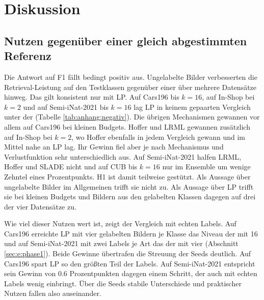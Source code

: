 \chapter{Diskussion}
\label{chap:diskussion}

\section{Nutzen gegenüber einer gleich abgestimmten Referenz}
\label{sec:d:nutzen}

Die Antwort auf F1 fällt bedingt positiv aus. Ungelabelte Bilder verbesserten die Retrieval-Leistung auf den Testklassen gegenüber einer \UEBL über mehrere Datensätze hinweg. Das gilt konsistent nur mit \ac{LP}. Auf Cars196 bis $k=16$, auf In-Shop bei $k=2$ und auf Semi-iNat-2021 bis $k=16$ lag \ac{LP} in keinem gepaarten Vergleich unter der \UEBL (Tabelle \ref{tab:anhang:negativ}). Die übrigen Mechanismen gewannen vor allem auf Cars196 bei kleinen Budgets. Hoffer und \ac{LRML} gewannen zusätzlich auf In-Shop bei $k=2$, wo Hoffer ebenfalls in jedem Vergleich gewann und im Mittel nahe an \ac{LP} lag. Ihr Gewinn fiel aber je nach Mechanismus und Verlustfunktion sehr unterschiedlich aus. Auf Semi-iNat-2021 halfen \ac{LRML}, Hoffer und \ac{SLADE} nicht und auf \ac{CUB} bis $k=16$ nur im Ensemble um wenige Zehntel eines Prozentpunkts. H1 ist damit teilweise gestützt. Als Aussage über ungelabelte Bilder im Allgemeinen trifft sie nicht zu. Als Aussage über \ac{LP} trifft sie bei kleinen Budgets und Bildern aus den gelabelten Klassen dagegen auf drei der vier Datensätze zu.

Wie viel dieser Nutzen wert ist, zeigt der Vergleich mit echten Labels. Auf Cars196 erreichte \ac{LP} mit vier gelabelten Bildern je Klasse das Niveau der \UEBL mit 16 und auf Semi-iNat-2021 mit zwei Labels je Art das der \UEBL mit vier (Abschnitt \ref{sec:e:phase1}). Beide Gewinne übertrafen die Streuung der Seeds deutlich. Auf Cars196 spart \ac{LP} so den größten Teil der Labels. Auf Semi-iNat-2021 entspricht sein Gewinn von \num{0.6} Prozentpunkten dagegen einem Schritt, der auch mit echten Labels wenig einbringt. Über die Seeds stabile Unterschiede und praktischer Nutzen fallen also auseinander.

